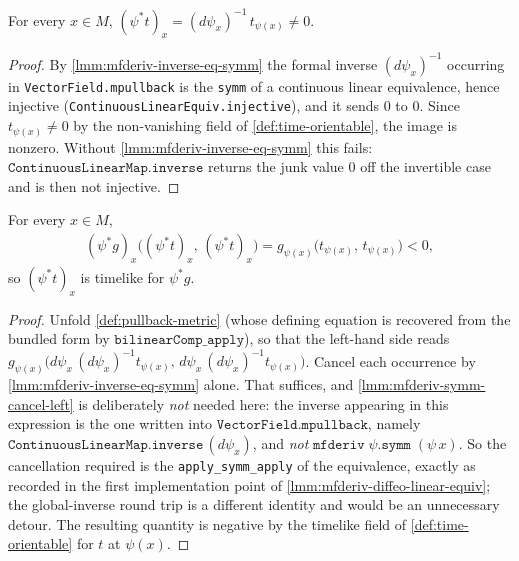 \begin{lemma}
    \label{lmm:pullback-time-orientation-ne-zero}
    \leanok
    For every $x \in M$, $(\psi^*t)_x = (d\psi_x)^{-1}\,t_{\psi(x)} \neq 0$.
\end{lemma}
\begin{proof}
    \leanok
    By \ref{lmm:mfderiv-inverse-eq-symm} the formal inverse $(d\psi_x)^{-1}$ occurring in \texttt{VectorField.mpullback} is the \texttt{symm} of a continuous linear equivalence, hence injective (\texttt{ContinuousLinearEquiv.injective}), and it sends $0$ to $0$. Since $t_{\psi(x)} \neq 0$ by the non-vanishing field of \ref{def:time-orientable}, the image is nonzero. Without \ref{lmm:mfderiv-inverse-eq-symm} this fails: $\mathtt{ContinuousLinearMap.inverse}$ returns the junk value $0$ off the invertible case and is then not injective.
\end{proof}

\begin{lemma}
    \label{lmm:pullback-time-orientation-timelike}
    \leanok
    For every $x \in M$,
    \begin{align}
        (\psi^*g)_x\big((\psi^*t)_x,\, (\psi^*t)_x\big) = g_{\psi(x)}\big(t_{\psi(x)},\, t_{\psi(x)}\big) < 0,
    \end{align}
    so $(\psi^*t)_x$ is timelike for $\psi^*g$.
\end{lemma}
\begin{proof}
    \leanok
    Unfold \ref{def:pullback-metric} (whose defining equation is recovered from the bundled form by $\mathtt{bilinearComp\_apply}$), so that the left-hand side reads $g_{\psi(x)}\big(d\psi_x\,(d\psi_x)^{-1} t_{\psi(x)},\, d\psi_x\,(d\psi_x)^{-1} t_{\psi(x)}\big)$. Cancel each occurrence by \ref{lmm:mfderiv-inverse-eq-symm} alone. That suffices, and \ref{lmm:mfderiv-symm-cancel-left} is deliberately \emph{not} needed here: the inverse appearing in this expression is the one written into $\mathtt{VectorField.mpullback}$, namely $\mathtt{ContinuousLinearMap.inverse}\,(d\psi_x)$, and \emph{not} $\mathtt{mfderiv}\;\psi.\mathtt{symm}\;(\psi\,x)$. So the cancellation required is the \texttt{apply\_symm\_apply} of the equivalence, exactly as recorded in the first implementation point of \ref{lmm:mfderiv-diffeo-linear-equiv}; the global-inverse round trip is a different identity and would be an unnecessary detour. The resulting quantity is negative by the timelike field of \ref{def:time-orientable} for $t$ at $\psi(x)$.
\end{proof}

